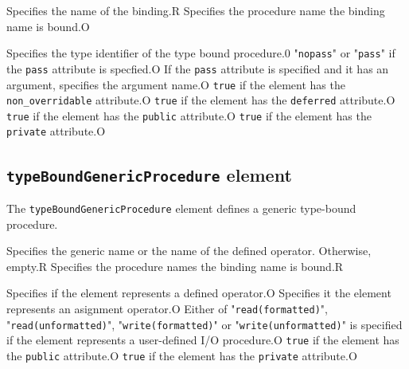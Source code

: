 \begin{XcodeMLChildElements}
{Specifies the name of the binding.}{R}
{Specifies the procedure name the binding name is bound.}{O}
\end{XcodeMLChildElements}

\begin{XcodeMLAttributes}
{Specifies the type identifier of the type bound procedure.}{0}
{"{\tt nopass}" or "{\tt pass}" if the {\tt pass} attribute is specfied.}{O}
{If the {\tt pass} attribute is specified and it has an argument, specifies the argument name.}{O}
{{\tt true} if the element has the {\tt non\_overridable} attribute.}{O}
{{\tt true} if the element has the {\tt deferred} attribute.}{O}
{{\tt true} if the element has the {\tt public} attribute.}{O}
{{\tt true} if the element has the {\tt private} attribute.}{O}
\end{XcodeMLAttributes}


\subsection{ {\tt typeBoundGenericProcedure} element}

The {\tt typeBoundGenericProcedure} element defines a generic type-bound procedure.


\begin{XcodeMLChildElements}
{Specifies the generic name or the name of the defined operator. Otherwise, empty.}{R}
{Specifies the procedure names the binding name is bound.}{R}
\end{XcodeMLChildElements}

\begin{XcodeMLAttributes}
{Specifies if the element represents a defined operator.}{O}
{Specifies it the element represents an asignment operator.}{O}
{Either of "{\tt read(formatted)}", "{\tt read(unformatted)}",
 "{\tt write(formatted)}" or "{\tt write(unformatted)}" is specified if the element represents
 a user-defined I/O procedure.}{O}
{{\tt true} if the element has the {\tt public} attribute.}{O}
{{\tt true} if the element has the {\tt private} attribute.}{O}
\end{XcodeMLAttributes}



